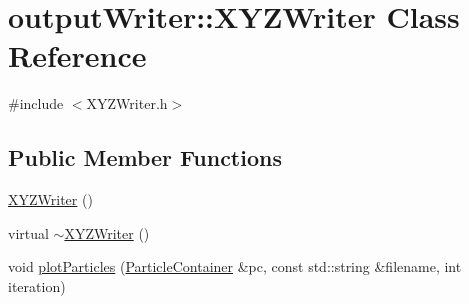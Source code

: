 \hypertarget{classoutputWriter_1_1XYZWriter}{\section{output\+Writer\+:\+:X\+Y\+Z\+Writer Class Reference}
\label{classoutputWriter_1_1XYZWriter}
}


{\ttfamily \#include $<$X\+Y\+Z\+Writer.\+h$>$}

\subsection*{Public Member Functions}
\begin{DoxyCompactItemize}
\item 
\hyperlink{classoutputWriter_1_1XYZWriter_a73b1eacd622152993f2fa6c181e69c8a}{X\+Y\+Z\+Writer} ()
\item 
virtual \hyperlink{classoutputWriter_1_1XYZWriter_ad3fe6dbb5e1aa5bdeffcc9986795309b}{$\sim$\+X\+Y\+Z\+Writer} ()
\item 
void \hyperlink{classoutputWriter_1_1XYZWriter_a248771015e776190a8c5b89f5ea82699}{plot\+Particles} (\hyperlink{classParticleContainer}{Particle\+Container} \&pc, const std\+::string \&filename, int iteration)
\end{DoxyCompactItemize}


